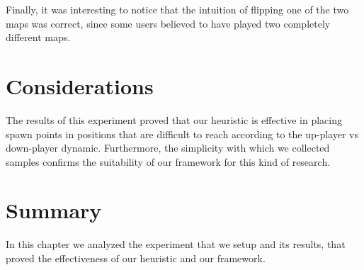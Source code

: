 \par

Finally, it was interesting to notice that the intuition of flipping one of the two maps was correct, since some users believed to have played two completely different maps.  


\section{Considerations}

The results of this experiment proved that our heuristic is effective in placing spawn points in positions that are difficult to reach according to the up-player vs down-player dynamic. Furthermore, the simplicity with which we collected samples confirms the suitability of our framework for this kind of research.


\section{Summary}

In this chapter we analyzed the experiment that we setup and its results, that proved the effectiveness of our heuristic and our framework.

